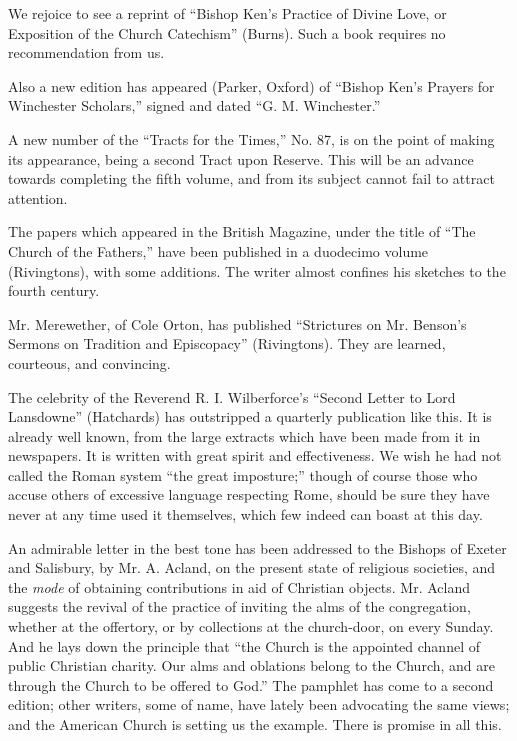 We rejoice to see a reprint of ``Bishop Ken's
Practice of Divine Love, or Exposition of the Church Catechism''
(Burns). Such a book requires no recommendation from us.

Also a new edition has appeared (Parker, Oxford) of
``Bishop Ken's Prayers for Winchester Scholars,'' signed and dated ``G. M. Winchester.''

A new number of the ``Tracts for the Times,'' No.
87, is on the point of making its appearance, being a second Tract upon
Reserve. This will be an advance towards completing the fifth volume,
and from its subject cannot fail to attract attention.

The papers which appeared in the British Magazine,
under the title of ``The Church of the Fathers,'' have been published
in a duodecimo volume (Rivingtons), with some additions. The writer
almost confines his sketches to the fourth century.

Mr. Merewether, of Cole Orton, has published ``Strictures on Mr. Benson's Sermons on Tradition and Episcopacy''
(Rivingtons).
They are learned, courteous, and convincing.

The celebrity of the Reverend R. I. Wilberforce's ``Second Letter to Lord Lansdowne''
(Hatchards) has outstripped a
quarterly publication like this. It is already well known, from the
large extracts which have been made from it in newspapers. It is written
with great spirit and effectiveness. We wish he had not called the Roman
system ``the great imposture;'' though of course those who accuse
others of excessive language respecting Rome, should be sure they have
never at any time used it themselves, which few indeed can boast at this
day.

An admirable letter in the best tone has been
addressed to the Bishops of Exeter and Salisbury, by Mr. A. Acland, on
the present state of religious societies, and the \emph{mode} of
obtaining contributions in aid of Christian objects. Mr. Acland suggests
the revival of the practice of inviting the alms of the congregation,
whether at the offertory, or by collections at the church-door, on every
Sunday. And he lays down the principle that ``the Church is the
appointed channel of public Christian charity. Our alms and oblations
belong to the Church, and are through the Church to be offered to
God.'' The pamphlet has come to a second edition; other writers, some
of name, have lately been advocating the same views; and the American
Church is setting us the example. There is promise in all this.

